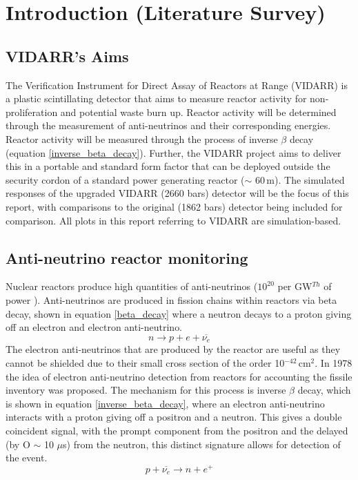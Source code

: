 \documentclass[12pt,a4paper]{article}
\begin{document}
\section{Introduction (Literature Survey)}
\subsection{VIDARR's Aims}
The Verification Instrument for Direct Assay of Reactors at Range (VIDARR) is a plastic scintillating detector that aims to measure reactor activity for non-proliferation and potential waste burn up. Reactor activity will be determined through the measurement of anti-neutrinos and their corresponding energies. Reactor activity will be measured through the process of inverse $\beta$ decay (equation \ref{inverse_beta_decay}). Further, the VIDARR project aims to deliver this in a portable and standard form factor that can be deployed outside the security cordon of a standard power generating reactor ($\sim$ 60\,m). The simulated responses of the upgraded VIDARR (2660 bars) detector will be the focus of this report, with comparisons to the original (1862 bars) detector being included for comparison. All plots in this report referring to VIDARR are simulation-based.

\subsection{Anti-neutrino reactor monitoring}
Nuclear reactors produce high quantities of anti-neutrinos ($10^{20}$ per GW$^{Th}$ of power \cite{muller_reactors}). Anti-neutrinos are produced in fission chains within reactors via beta decay, shown in equation \ref{beta_decay} where a neutron decays to a proton giving off an electron and electron anti-neutrino.
\begin{equation}
n \rightarrow p + e + \overline{\nu_{e}}
\label{beta_decay}
\end{equation}
The electron anti-neutrinos that are produced by the reactor are useful as they cannot be shielded due to their small cross section of the order 10$^{-42}$\,cm$^2$\cite{vogel_beacom_nu_cross}. In 1978 \cite{an_proposed} the idea of electron anti-neutrino detection from reactors for accounting the fissile inventory was proposed. The mechanism for this process is inverse $\beta$ decay, which is shown in equation \ref{inverse_beta_decay}, where an electron anti-neutrino interacts with a proton giving off a positron and a neutron. This gives a double coincident signal, with the prompt component from the positron and the delayed (by O $\sim$ 10 $\mu$s) from the neutron, this distinct signature allows for detection of the event.
\begin{equation}
p + \overline{\nu_{e}} \rightarrow n + e^+ 
\label{inverse_beta_decay}
\end{equation}
\end{document}
